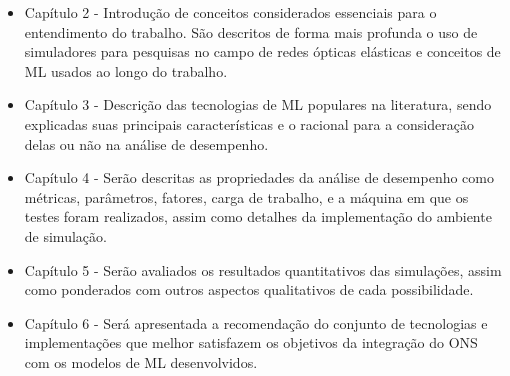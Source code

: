 \begin{itemize}
  \item Capítulo 2 - Introdução de conceitos considerados essenciais para o entendimento do trabalho. São descritos de forma mais profunda o uso de simuladores para pesquisas no campo de redes ópticas elásticas e conceitos de ML usados ao longo do trabalho.

  \item Capítulo 3 - Descrição das tecnologias de ML populares na literatura, sendo explicadas suas principais características e o racional para a consideração delas ou não na análise de desempenho.

  \item Capítulo 4 - Serão descritas as propriedades da análise de desempenho como métricas, parâmetros, fatores, carga de trabalho, e a máquina em que os testes foram realizados, assim como detalhes da implementação do ambiente de simulação.

  \item Capítulo 5 - Serão avaliados os resultados quantitativos das simulações, assim como ponderados com outros aspectos qualitativos de cada possibilidade.

  \item Capítulo 6 - Será apresentada a recomendação do conjunto de tecnologias e implementações que melhor satisfazem os objetivos da integração do ONS com os modelos de ML desenvolvidos.
\end{itemize}









